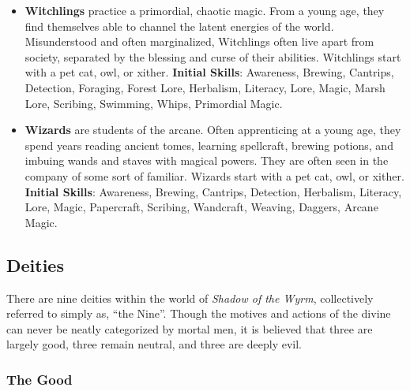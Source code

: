 \begin{itemize}
\item {\bf Witchlings} practice a primordial, chaotic magic.  From a young 
age, they find themselves able to channel the latent energies of the 
world.  Misunderstood and often marginalized, Witchlings often live apart 
from society, separated by the blessing and curse of their abilities.
Witchlings start with a pet cat, owl, or xither.  \textbf{Initial Skills}: 
Awareness, Brewing, Cantrips, Detection, Foraging, Forest Lore, Herbalism, 
Literacy, Lore, Magic, Marsh Lore, Scribing, Swimming, Whips, Primordial 
Magic.

\item {\bf Wizards} are students of the arcane.  Often apprenticing at a 
young age, they spend years reading ancient tomes, learning spellcraft, 
brewing potions, and imbuing wands and staves with magical powers.  They 
are often seen in the company of some sort of familiar.  Wizards start with
a pet cat, owl, or xither.  \textbf{Initial Skills}: Awareness, Brewing, 
Cantrips, Detection, Herbalism, Literacy, Lore, Magic, Papercraft, Scribing, 
Wandcraft, Weaving, Daggers, Arcane Magic.
\end{itemize}

\subsection{Deities}

There are nine deities within the world of {\it Shadow of the Wyrm}, 
collectively referred to simply as, ``the Nine''.  Though the motives and 
actions of the divine can never be neatly categorized by mortal men, it is 
believed that three are largely good, three remain neutral, and three are 
deeply evil.

\subsubsection{The Good}

